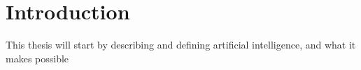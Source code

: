 \chapter{Introduction}
This thesis will start by describing and defining artificial intelligence, and what it makes possible